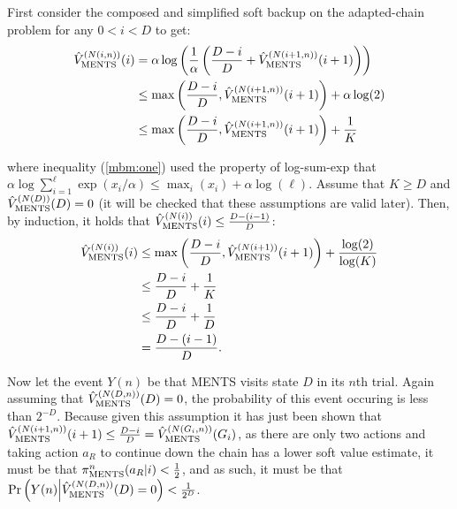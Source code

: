\begin{proofoutline}
        First consider the composed and simplified soft backup on the adapted-chain problem for any $0<i<D$ to get:
        \begin{align}
                {\hat{V}^{(N(i,n))}_{{\textnormal{MENTS}}}}(i) & = \alpha \log\left( \frac{1}{\alpha} 
                    \left( \frac{D-i}{D} + {\hat{V}^{(N(i+1,n))}_{{\textnormal{MENTS}}}}(i+1) \right)\right) \\
                & \leq \max\left(\frac{D-i}{D},{\hat{V}^{(N(i+1,n))}_{{\textnormal{MENTS}}}}(i+1)\right) + \alpha\log(2) \label{mbm:one} \\
                & \leq \max\left(\frac{D-i}{D},{\hat{V}^{(N(i+1,n))}_{{\textnormal{MENTS}}}}(i+1)\right) + \frac{1}{K}
        \end{align}
        
        where inequality (\ref{mbm:one}) used the property of log-sum-exp that $\alpha \log \sum_{i=1}^\ell \exp (x_i/\alpha) \leq \max_i (x_i) + \alpha \log(\ell)$. Assume that $K \geq D$ and ${\hat{V}^{(N(D))}_{{\textnormal{MENTS}}}}(D)=0$ (it will be checked that these assumptions are valid later). Then, by induction, it holds that ${\hat{V}^{(N(i))}_{{\textnormal{MENTS}}}}(i)\leq \frac{D-(i-1)}{D}$:
        \begin{align}
            {\hat{V}^{(N(i))}_{{\textnormal{MENTS}}}}(i) 
            & \leq \max\left(\frac{D-i}{D},{\hat{V}^{(N(i+1))}_{{\textnormal{MENTS}}}}(i+1)\right) + \frac{\log(2)}{\log(K)} \\
            & \leq \frac{D-i}{D} + \frac{1}{K} \\
            & \leq \frac{D-i}{D} + \frac{1}{D} \\
            & = \frac{D-(i-1)}{D}.
        \end{align}
        
        Now let the event $Y(n)$ be that MENTS visits state $D$ in its $n$th trial. Again assuming that ${\hat{V}^{(N(D,n))}_{{\textnormal{MENTS}}}}(D)=0$, the probability of this event occuring is less than $2^{-D}$. Because given this assumption it has just been shown that ${\hat{V}^{(N(i+1,n))}_{{\textnormal{MENTS}}}}(i+1)\leq \frac{D-i}{D} = {\hat{V}^{(N(G_{i},n))}_{{\textnormal{MENTS}}}}(G_{i})$,  as there are only two actions and taking action $a_R$ to continue down the chain has a lower soft value estimate, it must be that ${\pi^{n}_{{\textnormal{MENTS}}}}(a_R|i) < \frac{1}{2}$, and as such, it must be that $\Pr\left(Y(n) \middle| {\hat{V}^{(N(D,n))}_{{\textnormal{MENTS}}}}(D)=0\right) < \frac{1}{2^D}$. 
         

\end{proofoutline}
